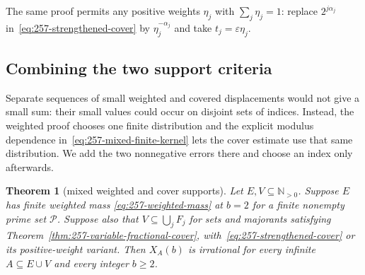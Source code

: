\documentclass[11pt]{article}
\theoremstyle{plain}
\newtheorem{thm}{Theorem}[section]
\theoremstyle{definition}
\theoremstyle{remark}
\newcommand{\Npos}{\mathbb{N}_{>0}}
\begin{document}
The same proof permits any positive weights $\eta_j$ with $\sum_j\eta_j=1$:
replace $2^{j\alpha_j}$ in~\eqref{eq:257-strengthened-cover} by
$\eta_j^{-\alpha_j}$ and take $t_j=\varepsilon\eta_j$.
\subsection{Combining the two support criteria}
Separate sequences of small weighted and covered displacements would not
give a small sum: their small values could occur on disjoint sets of
indices. Instead, the weighted proof chooses one finite distribution and
the explicit modulus dependence in~\eqref{eq:257-mixed-finite-kernel}
lets the cover estimate use that same distribution. We add the two
nonnegative errors there and choose an index only afterwards.
\begin{thm}[mixed weighted and cover supports]\label{thm:257-mixed-supports}
Let $E,V\subseteq\Npos$.  Suppose $E$ has finite weighted mass
\eqref{eq:257-weighted-mass} at $b=2$ for a finite nonempty prime set
$\mathcal P$.  Suppose also that $V\subseteq\bigcup_jF_j$ for sets and
majorants satisfying Theorem~\ref{thm:257-variable-fractional-cover},
with~\eqref{eq:257-strengthened-cover} or its positive-weight variant.
Then $X_A(b)$ is irrational for every
infinite $A\subseteq E\cup V$ and every integer $b\ge2$.
\end{thm}
\end{document}
